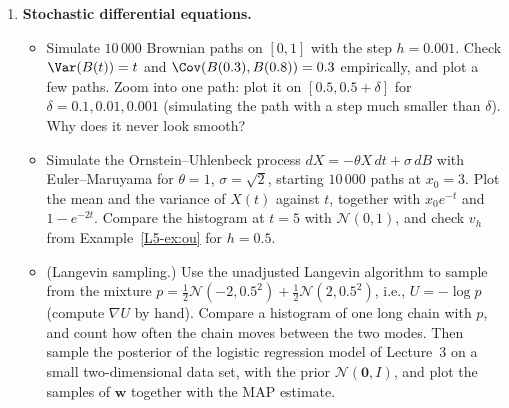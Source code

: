 \begin{enumerate}[label=\textbf{P\arabic*.}, leftmargin=*]
    \item \textbf{Stochastic differential equations.}
    \begin{itemize}
        \item Simulate $10\,000$ Brownian paths on $[0, 1]$ with the step $h = 0.001$. Check $\Var(B(t)) = t$ and $\Cov(B(0.3), B(0.8)) = 0.3$ empirically, and plot a few paths. Zoom into one path: plot it on $[0.5, 0.5 + \delta]$ for $\delta = 0.1, 0.01, 0.001$ (simulating the path with a step much smaller than $\delta$). Why does it never look smooth?
        \item Simulate the Ornstein--Uhlenbeck process $dX = -\theta X\,dt + \sigma\,dB$ with Euler--Maruyama for $\theta = 1$, $\sigma = \sqrt{2}$, starting $10\,000$ paths at $x_0 = 3$. Plot the mean and the variance of $X(t)$ against $t$, together with $x_0e^{-t}$ and $1 - e^{-2t}$. Compare the histogram at $t = 5$ with $\mathcal{N}(0, 1)$, and check $v_h$ from Example~\ref{L5-ex:ou} for $h = 0.5$.
        \item (Langevin sampling.) Use the unadjusted Langevin algorithm to sample from the mixture $p = \frac{1}{2}\mathcal{N}(-2, 0.5^2) + \frac{1}{2}\mathcal{N}(2, 0.5^2)$, i.e., $U = -\log p$ (compute $\nabla U$ by hand). Compare a histogram of one long chain with $p$, and count how often the chain moves between the two modes. Then sample the posterior of the logistic regression model of Lecture~3 on a small two-dimensional data set, with the prior $\mathcal{N}(\mathbf{0}, I)$, and plot the samples of $\mathbf{w}$ together with the MAP estimate.
    \end{itemize}

\end{enumerate}
\endgroup
